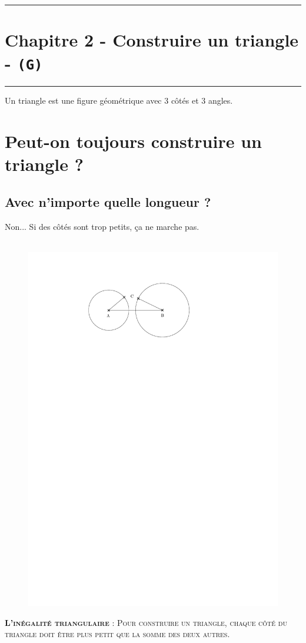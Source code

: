 \documentclass[11pt]{article}
\newcommand{\horrule}[1]{\rule{\linewidth}{#1}} %
\begin{document}
\setlength{\columnseprule}{1pt}

\horrule{2px}
\section*{Chapitre 2 - Construire un triangle - \texttt{(G)}}
\horrule{2px}

Un triangle est une figure géométrique avec 3 côtés et 3 angles.

\section*{Peut-on toujours construire un triangle ?}

\subsection*{Avec n'importe quelle longueur ?}

Non... Si des côtés sont trop petits, ça ne marche pas.

\begin{figure}[H]
      \centering
      \includegraphics[width=0.7\linewidth]{5x2-triangles/sources/inegalite-triangulaire.pdf}
\end{figure}

\textsc{\textbf{L'inégalité triangulaire} : Pour construire un triangle, chaque côté du triangle doit être plus petit que la somme des deux autres.} 
\end{document}
